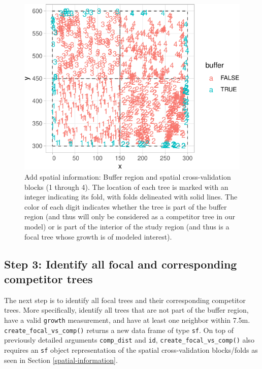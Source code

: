 \documentclass[12pt]{article}
\begin{document}
\begin{figure}

{\centering \includegraphics[width=0.66\linewidth]{Figures/scbi-spatial-information-1} 

}

\caption{Add spatial information: Buffer region and spatial cross-validation blocks (1 through 4). The location of each tree is marked with an integer indicating its fold, with folds delineated with solid lines. The color of each digit indicates whether the tree is part of the buffer region (and thus will only be considered as a competitor tree in our model) or is part of the interior of the study region (and thus is a focal tree whose growth is of modeled interest).}\label{fig:scbi-spatial-information}
\end{figure}

\hypertarget{focal-vs-comp}{%
\subsection{Step 3: Identify all focal and corresponding competitor
trees}\label{focal-vs-comp}}

The next step is to identify all focal trees and their corresponding
competitor trees. More specifically, identify all trees that are not
part of the buffer region, have a valid \texttt{growth} measurement, and
have at least one neighbor within 7.5m.
\texttt{create\_focal\_vs\_comp()} returns a new data frame of type
\texttt{sf}. On top of previously detailed arguments \texttt{comp\_dist}
and \texttt{id}, \texttt{create\_focal\_vs\_comp()} also requires an
\texttt{sf} object representation of the spatial cross-validation
blocks/folds as seen in Section \ref{spatial-information}.
\end{document}
